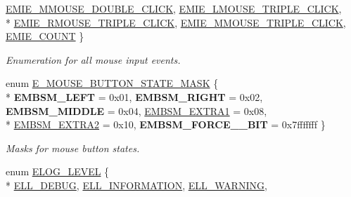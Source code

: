 \begin{DoxyCompactItemize}
\hyperlink{namespaceirr_a2dbf2a247aa17a9eeefbbf36ebd5739fa89b46e2e0e79ee26d9c2478ebe1dd9ee}{E\+M\+I\+E\+\_\+\+M\+M\+O\+U\+S\+E\+\_\+\+D\+O\+U\+B\+L\+E\+\_\+\+C\+L\+I\+CK}, 
\hyperlink{namespaceirr_a2dbf2a247aa17a9eeefbbf36ebd5739fa1145828528f7999720df3dd10a3a7de3}{E\+M\+I\+E\+\_\+\+L\+M\+O\+U\+S\+E\+\_\+\+T\+R\+I\+P\+L\+E\+\_\+\+C\+L\+I\+CK}, 
\\*
\hyperlink{namespaceirr_a2dbf2a247aa17a9eeefbbf36ebd5739fab24cbd2197b888022531799561c12b49}{E\+M\+I\+E\+\_\+\+R\+M\+O\+U\+S\+E\+\_\+\+T\+R\+I\+P\+L\+E\+\_\+\+C\+L\+I\+CK}, 
\hyperlink{namespaceirr_a2dbf2a247aa17a9eeefbbf36ebd5739fa72b90a632c6063a6f8e2fbf26187c9c6}{E\+M\+I\+E\+\_\+\+M\+M\+O\+U\+S\+E\+\_\+\+T\+R\+I\+P\+L\+E\+\_\+\+C\+L\+I\+CK}, 
\hyperlink{namespaceirr_a2dbf2a247aa17a9eeefbbf36ebd5739fa2cda06d009d09fc263752310cc64340f}{E\+M\+I\+E\+\_\+\+C\+O\+U\+NT}
 \}\begin{DoxyCompactList}\small\item\em Enumeration for all mouse input events. \end{DoxyCompactList}
\item 
enum \hyperlink{namespaceirr_a7057ec6fd3bba7cbbab3593c9e405a86}{E\+\_\+\+M\+O\+U\+S\+E\+\_\+\+B\+U\+T\+T\+O\+N\+\_\+\+S\+T\+A\+T\+E\+\_\+\+M\+A\+SK} \{ \\*
{\bfseries E\+M\+B\+S\+M\+\_\+\+L\+E\+FT} = 0x01, 
{\bfseries E\+M\+B\+S\+M\+\_\+\+R\+I\+G\+HT} = 0x02, 
{\bfseries E\+M\+B\+S\+M\+\_\+\+M\+I\+D\+D\+LE} = 0x04, 
\hyperlink{namespaceirr_a7057ec6fd3bba7cbbab3593c9e405a86ac0a92aabd6e6789f71b94f249f957f74}{E\+M\+B\+S\+M\+\_\+\+E\+X\+T\+R\+A1} = 0x08, 
\\*
\hyperlink{namespaceirr_a7057ec6fd3bba7cbbab3593c9e405a86ac560dffdf74df8ceebaedc79f1bb7c11}{E\+M\+B\+S\+M\+\_\+\+E\+X\+T\+R\+A2} = 0x10, 
{\bfseries E\+M\+B\+S\+M\+\_\+\+F\+O\+R\+C\+E\+\_\+\_\+\+B\+IT} = 0x7fffffff
 \}\begin{DoxyCompactList}\small\item\em Masks for mouse button states. \end{DoxyCompactList}
\item 
enum \hyperlink{namespaceirr_aa2d1cac68606a25ed24cfffccfa30a92}{E\+L\+O\+G\+\_\+\+L\+E\+V\+EL} \{ \\*
\hyperlink{namespaceirr_aa2d1cac68606a25ed24cfffccfa30a92a58d2a62ce004018e8bb6a29c732c70e3}{E\+L\+L\+\_\+\+D\+E\+B\+UG}, 
\hyperlink{namespaceirr_aa2d1cac68606a25ed24cfffccfa30a92a9d74de15737e326a91aec6f38c23f9cf}{E\+L\+L\+\_\+\+I\+N\+F\+O\+R\+M\+A\+T\+I\+ON}, 
\hyperlink{namespaceirr_aa2d1cac68606a25ed24cfffccfa30a92ad3d7f6bdd2f842cfc17561ba4be95001}{E\+L\+L\+\_\+\+W\+A\+R\+N\+I\+NG}, 

\end{DoxyCompactItemize}
